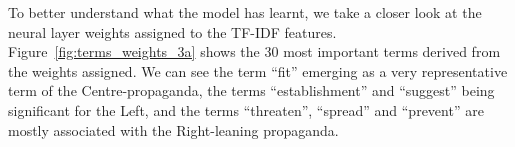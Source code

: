 

To better understand what the model has learnt, we take a closer look at the neural layer weights assigned to the TF-IDF features.
Figure~\ref{fig:terms_weights_3a} shows the 30 most important terms derived from the weights assigned.
We can see the term ``fit'' emerging as a very representative term of the Centre-propaganda, the terms ``establishment'' and ``suggest'' being significant for the Left, and the terms ``threaten'', ``spread'' and ``prevent'' are mostly associated with the Right-leaning propaganda.


